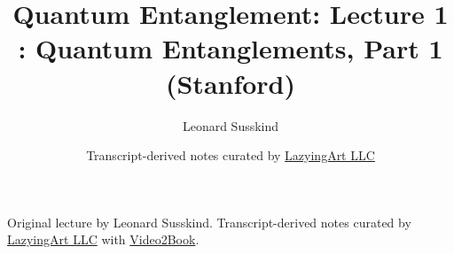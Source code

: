 \documentclass[11pt,oneside]{book}
\begin{document}
\frontmatter
\title{Quantum Entanglement: Lecture 1 : Quantum Entanglements, Part 1 (Stanford)}
\author{Leonard Susskind}
\date{Transcript-derived notes curated by \href{https://lazying.art}{LazyingArt LLC}}
\maketitle
\begin{center}
\small Original lecture by Leonard Susskind. Transcript-derived notes curated by \href{https://lazying.art}{LazyingArt LLC} with \href{https://github.com/lachlanchen/Video2Book}{Video2Book}.
\end{center}
\clearpage
\mainmatter

\end{document}
